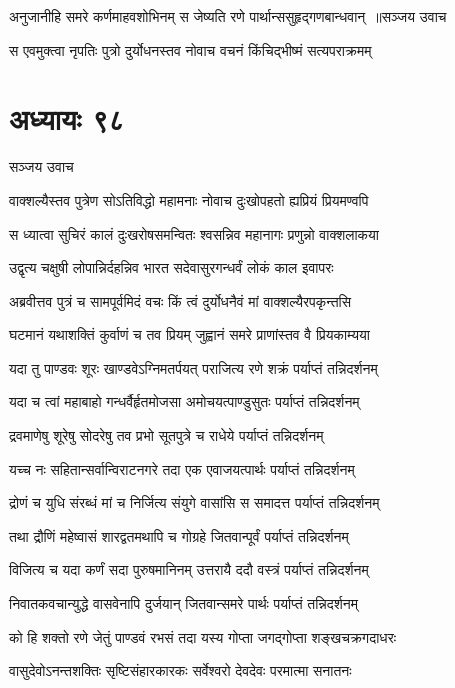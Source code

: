 \threelineshloka
{अनुजानीहि समरे कर्णमाहवशोभिनम्}
{स जेष्यति रणे पार्थान्ससुहृद्गणबान्धवान् ॥सञ्जय उवाच}
{}


\twolineshloka
{स एवमुक्त्वा नृपतिः पुत्रो दुर्योधनस्तव}
{नोवाच वचनं किंचिद्भीष्मं सत्यपराक्रमम्}


\chapter{अध्यायः ९८}
\twolineshloka
{सञ्जय उवाच}
{}


\twolineshloka
{वाक्शल्यैस्तव पुत्रेण सोऽतिविद्धो महामनाः}
{नोवाच दुःखोपहतो ह्यप्रियं प्रियमण्वपि}


\twolineshloka
{स ध्यात्वा सुचिरं कालं दुःखरोषसमन्वितः}
{श्वसन्निव महानागः प्रणुन्नो वाक्शलाकया}


\twolineshloka
{उद्वृत्य चक्षुषी लोपान्निर्दहन्निव भारत}
{सदेवासुरगन्धर्वं लोकं काल इवापरः}


\twolineshloka
{अब्रवीत्तव पुत्रं च सामपूर्वमिदं वचः}
{किं त्वं दुर्योधनैवं मां वाक्शल्यैरपकृन्तसि}


\twolineshloka
{घटमानं यथाशक्तिं कुर्वाणं च तव प्रियम्}
{जुह्वानं समरे प्राणांस्तव वै प्रियकाम्यया}


\twolineshloka
{यदा तु पाण्डवः शूरः खाण्डवेऽग्निमतर्पयत्}
{पराजित्य रणे शक्रं पर्याप्तं तन्निदर्शनम्}


\twolineshloka
{यदा च त्वां महाबाहो गन्धर्वैर्हृतमोजसा}
{अमोचयत्पाण्डुसुतः पर्याप्तं तन्निदर्शनम्}


\twolineshloka
{द्रवमाणेषु शूरेषु सोदरेषु तव प्रभो}
{सूतपुत्रे च राधेये पर्याप्तं तन्निदर्शनम्}


\twolineshloka
{यच्च नः सहितान्सर्वान्विराटनगरे तदा}
{एक एवाजयत्पार्थः पर्याप्तं तन्निदर्शनम्}


\twolineshloka
{द्रोणं च युधि संरब्धं मां च निर्जित्य संयुगे}
{वासांसि स समादत्त पर्याप्तं तन्निदर्शनम्}


\twolineshloka
{तथा द्रौणिं महेष्वासं शारद्वतमथापि च}
{गोग्रहे जितवान्पूर्वं पर्याप्तं तन्निदर्शनम्}


\twolineshloka
{विजित्य च यदा कर्णं सदा पुरुषमानिनम्}
{उत्तरायै ददौ वस्त्रं पर्याप्तं तन्निदर्शनम्}


\twolineshloka
{निवातकवचान्युद्धे वासवेनापि दुर्जयान्}
{जितवान्समरे पार्थः पर्याप्तं तन्निदर्शनम्}


\twolineshloka
{को हि शक्तो रणे जेतुं पाण्डवं रभसं तदा}
{यस्य गोप्ता जगद्गोप्ता शङ्खचक्रगदाधरः}


\twolineshloka
{वासुदेवोऽनन्तशक्तिः सृष्टिसंहारकारकः}
{सर्वेश्वरो देवदेवः परमात्मा सनातनः}


